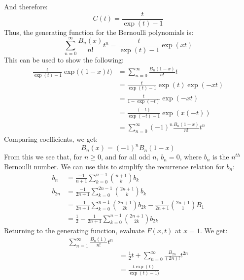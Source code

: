 \documentclass[crop=false,class=book,oneside]{standalone}
\begin{document}
            And therefore:
            \begin{equation}
                C(t)=\frac{t}{\exp(t)-1}
            \end{equation}
            Thus, the generating function for the Bernoulli
            polynomials is:
            \begin{equation}
                \sum_{n=0}^{\infty}
                \frac{B_{n}(x)}{n!}t^{n}
                =\frac{t}{\exp(t)-1}\exp(xt)
            \end{equation}
            This can be used to show the following:
            \begin{align}
                \frac{t}{\exp(t)-1}
                \exp\big((1-x)t\big)
                &=\sum_{n=0}^{\infty}
                    \frac{B_{n}(1-x)}{n!}t^{}\\
                &=\frac{t}{\exp(t)-1}\exp(t)\exp(-xt)\\
                &=\frac{t}{1-\exp(-t)}\exp(-xt)\\
                &=\frac{(-t)}{\exp(-t)-1}\exp(x(-t))\\
                &=\sum_{n=0}^{\infty}(-1)^{n}
                \frac{B_{n}(1-x)}{n!}t^{n}
            \end{align}
            Comparing coefficients, we get:
            \begin{equation}
                B_{n}(x)=(-1)^{n}B_{n}(1-x)
            \end{equation}
            From this we see that, for $n\geq{0}$, and for all
            odd $n$, $b_{n}=0$, where $b_{n}$ is the
            $n^{th}$ Bernoulli number. We can use this to simplify
            the recurrence relation for $b_{n}$:
            \begin{align}
                b_{n}&=\frac{-1}{n+1}
                \sum_{k=0}^{n-1}\binom{n+1}{k}b_{k}\\
                b_{2n}&=\frac{-1}{2n+1}
                \sum_{k=0}^{2n-1}\binom{2n+1}{k}b_{k}\\
                &=\frac{-1}{2n+1}\sum_{k=0}^{n-1}
                    \binom{2n+1}{2k}b_{2k}
                    -\frac{1}{2n+1}\binom{2n+1}{1}B_{1}\\
                    &=\frac{1}{2}-\frac{1}{2n+1}
                    \sum_{k=0}^{n-1}\binom{2n+1}{2k}b_{2k}
            \end{align}
            Returning to the generating function, evaluate
            $F(x,t)$ at $x=1$. We get:
            \begin{align}
                \sum_{n=1}^{\infty}\frac{B_{n}(1)}{n!}t^{n}\\
                &=\frac{1}{2}t+\sum_{n=0}^{\infty}
                \frac{B_{2n}}{(2n)!}t^{2n}\\
                &=\frac{t\exp(t)}{\exp(t)-1)}
            \end{align}
\end{document}
